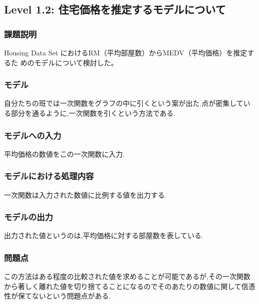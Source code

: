 \subsection{Level 1.2: 住宅価格を推定するモデルについて}
\subsubsection{課題説明}
Housing Data Set\cite{housingdata}
におけるRM（平均部屋数）からMEDV（平均価格）を推定するた
めのモデルについて検討した。

\subsubsection{モデル}
自分たちの班では一次関数をグラフの中に引くという案が出た.点が密集している部分を通るように,一次関数を引くという方法である.


\subsubsection{モデルへの入力}
平均価格の数値をこの一次関数に入力.
\subsubsection{モデルにおける処理内容}
一次関数は入力された数値に比例する値を出力する.
\subsubsection{モデルの出力}
出力された値というのは,平均価格に対する部屋数を表している.
\subsubsection{問題点}
この方法はある程度の比較された値を求めることが可能であるが,その一次関数から著しく離れた値を切り捨てることになるのでそのあたりの数値に関して信憑性が保てないという問題点がある.



